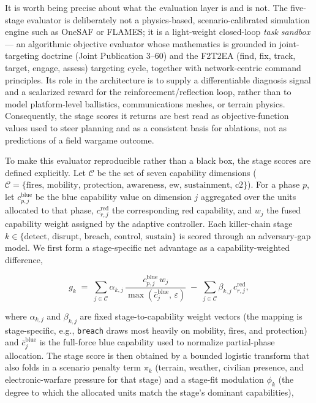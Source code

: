 It is worth being precise about what the evaluation layer is and is not. The five-stage evaluator is deliberately not a physics-based, scenario-calibrated simulation engine such as OneSAF or FLAMES; it is a light-weight closed-loop \emph{task sandbox} --- an algorithmic objective evaluator whose mathematics is grounded in joint-targeting doctrine (Joint Publication 3--60) and the F2T2EA (find, fix, track, target, engage, assess) targeting cycle, together with network-centric command principles. Its role in the architecture is to supply a differentiable diagnosis signal and a scalarized reward for the reinforcement/reflection loop, rather than to model platform-level ballistics, communications meshes, or terrain physics. Consequently, the stage scores it returns are best read as objective-function values used to steer planning and as a consistent basis for ablations, not as predictions of a field wargame outcome.

To make this evaluator reproducible rather than a black box, the stage scores are defined explicitly. Let $\mathcal{C}$ be the set of seven capability dimensions ($\mathcal{C} = \{\text{fires, mobility, protection, awareness, ew, sustainment, c2}\}$). For a phase $p$, let $c^{\text{blue}}_{p,j}$ be the blue capability value on dimension $j$ aggregated over the units allocated to that phase, $c^{\text{red}}_{r,j}$ the corresponding red capability, and $w_{j}$ the fused capability weight assigned by the adaptive controller. Each killer-chain stage $k \in \{\text{detect, disrupt, breach, control, sustain}\}$ is scored through an adversary-gap model. We first form a stage-specific net advantage as a capability-weighted difference,

\begin{equation}
g_k \;=\; \sum_{j \in \mathcal{C}} \alpha_{k,j}\,\frac{c^{\text{blue}}_{p,j}\,w_{j}}{\max(\bar{c}^{\text{blue}}_{j},\,\varepsilon)} \;-\; \sum_{j \in \mathcal{C}} \beta_{k,j}\,c^{\text{red}}_{r,j},
\end{equation}

where $\alpha_{k,j}$ and $\beta_{k,j}$ are fixed stage-to-capability weight vectors (the mapping is stage-specific, e.g., \texttt{breach} draws most heavily on mobility, fires, and protection) and $\bar{c}^{\text{blue}}_{j}$ is the full-force blue capability used to normalize partial-phase allocation. The stage score is then obtained by a bounded logistic transform that also folds in a scenario penalty term $\pi_k$ (terrain, weather, civilian presence, and electronic-warfare pressure for that stage) and a stage-fit modulation $\phi_k$ (the degree to which the allocated units match the stage's dominant capabilities),

